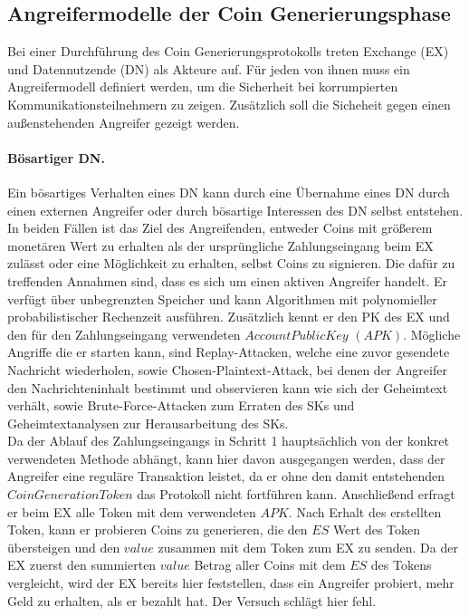 \documentclass[
	fontsize=11pt,
	headings=small,
	parskip=half,           %
	bibliography=totoc,
	numbers=noenddot,       %
	open=any,               %
]{scrreprt}
\begin{document}
\subsection{Angreifermodelle der Coin Generierungsphase}
\label{subsec:adversaryCoinGen}
Bei einer Durchführung des Coin Generierungsprotokolls treten Exchange (EX) und Datennutzende (DN) als Akteure auf. Für jeden von ihnen muss ein Angreifermodell definiert werden, um die Sicherheit bei korrumpierten Kommunikationsteilnehmern zu zeigen. Zusätzlich soll die Sicheheit gegen einen außenstehenden Angreifer gezeigt werden.

\paragraph{Bösartiger DN.}
Ein bösartiges Verhalten eines DN kann durch eine Übernahme eines DN durch einen externen Angreifer oder durch bösartige Interessen des DN selbst entstehen. In beiden Fällen ist das Ziel des Angreifenden, entweder Coins mit größerem monetären Wert zu erhalten als der ursprüngliche Zahlungseingang beim EX zulässt oder eine Möglichkeit zu erhalten, selbst Coins zu signieren. Die dafür zu treffenden Annahmen sind, dass es sich um einen aktiven Angreifer handelt. Er verfügt über unbegrenzten Speicher und kann Algorithmen mit polynomieller probabilistischer Rechenzeit ausführen. Zusätzlich kennt er den PK des EX und den für den Zahlungseingang verwendeten $AccountPublicKey$ $(APK)$. Mögliche Angriffe die er starten kann, sind Replay-Attacken, welche eine zuvor gesendete Nachricht wiederholen, sowie Chosen-Plaintext-Attack, bei denen der Angreifer den Nachrichteninhalt bestimmt und observieren kann wie sich der Geheimtext verhält, sowie Brute-Force-Attacken zum Erraten des SKs und Geheimtextanalysen zur Herausarbeitung des SKs.\\

Da der Ablauf des Zahlungseingangs in Schritt 1 hauptsächlich von der konkret verwendeten Methode abhängt, kann hier davon ausgegangen werden, dass der Angreifer eine reguläre Transaktion leistet, da er ohne den damit entstehenden $CoinGenerationToken$ das Protokoll nicht fortführen kann. 
Anschließend erfragt er beim EX alle Token mit dem verwendeten $APK$. Nach Erhalt des erstellten Token, kann er probieren Coins zu generieren, die den $ES$ Wert des Token übersteigen und den $value$ zusammen mit dem Token zum EX zu senden. Da der EX zuerst den summierten $value$ Betrag aller Coins mit dem $ES$ des Tokens vergleicht, wird der EX bereits hier feststellen, dass ein Angreifer probiert, mehr Geld zu erhalten, als er bezahlt hat. Der Versuch schlägt hier fehl.
\end{document}
